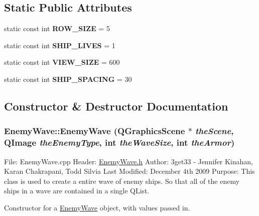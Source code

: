 \subsection*{Static Public Attributes}
\begin{DoxyCompactItemize}
\item 
\hypertarget{class_enemy_wave_a92747d9224953345e5faea27510f4313}{
static const int {\bfseries ROW\_\-SIZE} = 5}
\label{class_enemy_wave_a92747d9224953345e5faea27510f4313}

\item 
\hypertarget{class_enemy_wave_aa42be52305fb12e33a6af3f1573ce086}{
static const int {\bfseries SHIP\_\-LIVES} = 1}
\label{class_enemy_wave_aa42be52305fb12e33a6af3f1573ce086}

\item 
\hypertarget{class_enemy_wave_aa6369824dce6f573abc34beb253f2202}{
static const int {\bfseries VIEW\_\-SIZE} = 600}
\label{class_enemy_wave_aa6369824dce6f573abc34beb253f2202}

\item 
\hypertarget{class_enemy_wave_a34c69f43a3011326088680a398f5da42}{
static const int {\bfseries SHIP\_\-SPACING} = 30}
\label{class_enemy_wave_a34c69f43a3011326088680a398f5da42}

\end{DoxyCompactItemize}


\subsection{Constructor \& Destructor Documentation}
\hypertarget{class_enemy_wave_a187dbe0f6d62c4b72570c707bdd06cdc}{
\subsubsection[{EnemyWave}]{\setlength{\rightskip}{0pt plus 5cm}EnemyWave::EnemyWave (QGraphicsScene $\ast$ {\em theScene}, \/  QImage {\em theEnemyType}, \/  int {\em theWaveSize}, \/  int {\em theArmor})}}
\label{class_enemy_wave_a187dbe0f6d62c4b72570c707bdd06cdc}
File: EnemyWave.cpp Header: \hyperlink{_enemy_wave_8h_source}{EnemyWave.h} Author: 3get33 -\/ Jennifer Kinahan, Karan Chakrapani, Todd Silvia Last Modified: December 4th 2009 Purpose: This class is used to create a entire wave of enemy ships. So that all of the enemy ships in a wave are contained in a single QList.

Constructor for a \hyperlink{class_enemy_wave}{EnemyWave} object, with values passed in.

